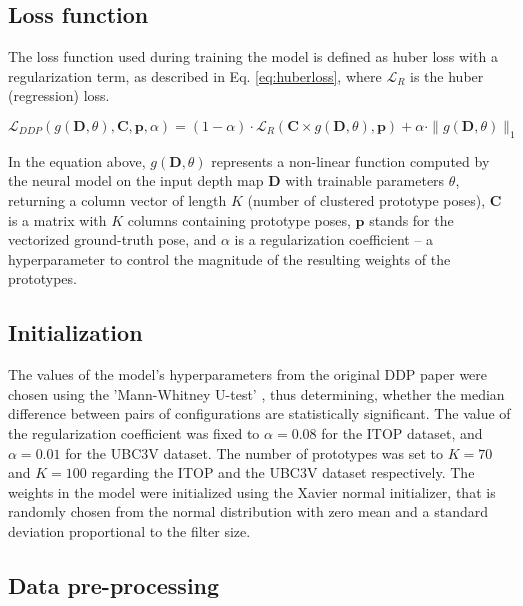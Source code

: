 \subsection{Loss function}

The loss function used during training the model is defined as huber loss with a regularization term, as described in Eq. \ref{eq:huberloss}, where $\mathcal{L}_R$ is the huber (regression) loss.\par

\begin{equation}
\mathcal{L}_{DDP}(g(\mathbf{D}, \theta), \mathbf{C}, \mathbf{p}, \alpha) = (1 - \alpha) \cdot \mathcal{L}_R(\mathbf{C} \times g(\mathbf{D}, \theta), \mathbf{p}) + \alpha \cdot \|g(\mathbf{D}, \theta)\|_1 \label{eq:huberloss}
\end{equation} 

\noindent In the equation above, $g(\mathbf{D}, \theta)$ represents a non-linear function computed by the neural model on the input depth map $\mathbf{D}$ with trainable parameters $\theta$, returning a column vector of length $K$ (number of clustered prototype poses), $\mathbf{C}$ is a matrix with $K$ columns containing prototype poses, $\mathbf{p}$ stands for the vectorized ground-truth pose,  and $\alpha$ is a regularization coefficient  – a hyperparameter to control the magnitude of the resulting weights of the prototypes.

\subsection{Initialization}

The values of the model's hyperparameters from the original DDP paper were chosen using the 'Mann-Whitney U-test' \cite{mann1947}, thus determining, whether the median difference between pairs of configurations are statistically significant. The value of the regularization coefficient was fixed to $\alpha = 0.08$ for the ITOP dataset, and $\alpha = 0.01$ for the UBC3V dataset. The number of prototypes was set to $K=70$ and $K=100$ regarding the ITOP and the UBC3V dataset respectively. The weights in the model were initialized using the Xavier normal initializer, that is randomly chosen from the normal distribution with zero mean and a standard deviation proportional to the filter size.

\subsection{Data pre-processing}



